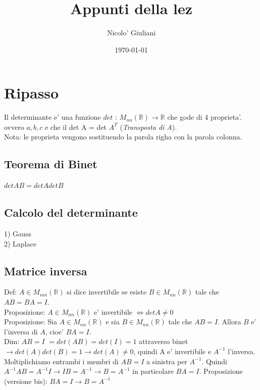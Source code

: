 \documentclass[a4paper,12pt]{article}
\title{Appunti della lez}
\author{Nicolo' Giuliani}
\date{\today}
\begin{document}
\section{Ripasso}
Il determinante e' una funzione $det \text{ : }M_{nn}(\mathbb{R}) \to \mathbb{R}$ che gode di 4 proprieta'.
\\ovvero $a,b,c$ e che il det A = det $A^T$ (\textit{Transposta di A}).
\\Nota: le proprieta vengono sostituendo la parola righa con la parola colonna.
\subsection{Teorema di Binet}
$det AB=detAdetB$
\subsection{Calcolo del determinante}
1) Gauss
\\2) Laplace
\\\subsection{Matrice inversa}
Def: $A \in M_{mn}(\mathbb{R})$ si dice invertibile se esiste $B \in M_{nn}(\mathbb{R})$ tale che $AB=BA=I$.
\\Proposizione: $A \in M_{nn}(\mathbb{R})$  e' invertibile $\iff det A \neq 0$
\\Proposizione: Sia $A \in M_{nn}(\mathbb{R})$  e sia $B \in M_{nn}(\mathbb{R})$  tale che $AB=I$. Allora $B$ e' l'inversa di $A$, cioe' $BA=I$.
\\Dim: $AB=I$ $= det(AB)=det(I)=1$ attraverso binet $\to det(A)det(B)=1 \to det(A)\neq 0$, quindi A e' invertibile e $A^{-1}$ l'inversa. 
\\Moltiplichiamo entrambi i membri di $AB=I$ a sinistra per $A^{-1}$. Quindi $A^{-1}AB=A^{-1}I \to IB=A^{-1} \to B=A^{-1}$ in particolare $BA=I$.
Proposizione (versione bis): $BA=I \to B=A^{-1}$
\end{document}
